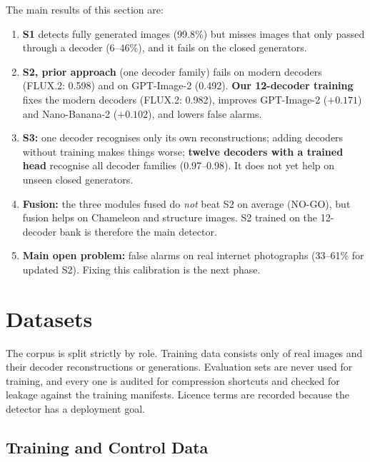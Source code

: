 The main results of this section are:

\begin{enumerate}
    \item \textbf{S1} detects fully generated images (99.8\%) but misses images that only passed through a decoder (6--46\%), and it fails on the closed generators.
    \item \textbf{S2, prior approach} (one decoder family) fails on modern decoders (FLUX.2: 0.598) and on GPT-Image-2 (0.492). \textbf{Our 12-decoder training} fixes the modern decoders (FLUX.2: 0.982), improves GPT-Image-2 ($+0.171$) and Nano-Banana-2 ($+0.102$), and lowers false alarms.
    \item \textbf{S3:} one decoder recognises only its own reconstructions; adding decoders without training makes things worse; \textbf{twelve decoders with a trained head} recognise all decoder families (0.97--0.98). It does not yet help on unseen closed generators.
    \item \textbf{Fusion:} the three modules fused do \textit{not} beat S2 on average (NO-GO), but fusion helps on Chameleon and structure images. S2 trained on the 12-decoder bank is therefore the main detector.
    \item \textbf{Main open problem:} false alarms on real internet photographs (33--61\% for updated S2). Fixing this calibration is the next phase.
\end{enumerate}

\newpage
\section{Datasets}
\label{sec:datasets}

The corpus is split strictly by role. Training data consists only of real images and their decoder reconstructions or generations. Evaluation sets are never used for training, and every one is audited for compression shortcuts and checked for leakage against the training manifests. Licence terms are recorded because the detector has a deployment goal.

\subsection{Training and Control Data}

